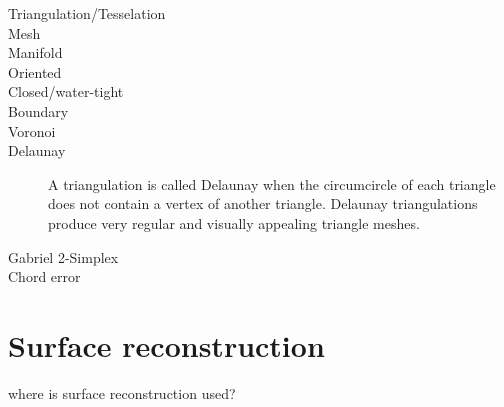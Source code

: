 \begin{description}
	\item[Triangulation/Tesselation]
	
	\item[Mesh]
	
	\item[Manifold]
	
	\item[Oriented]
	
	\item[Closed/water-tight]
	
	\item[Boundary]
	
	\item[Voronoi]
	
	\item[Delaunay]
	A triangulation is called Delaunay when the circumcircle of each triangle does not contain a vertex of another triangle.
	Delaunay triangulations produce very regular and visually appealing triangle meshes.
	
	\item[Gabriel 2-Simplex]
	
	\item[Chord error]
	
\end{description}


\section{Surface reconstruction}
\label{sec:surface_reconstruction}

where is surface reconstruction used?

